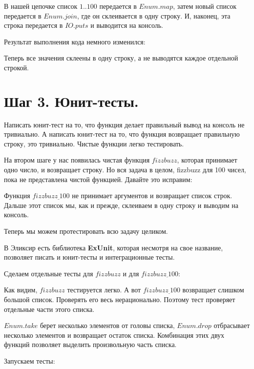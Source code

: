 В нашей цепочке список $1..100$ передается в $Enum.map$, затем новый список передается в $Enum.join$, где он склеивается в одну строку. И, наконец, эта строка передается в $IO.puts$ и выводится на консоль.

Результат выполнения кода немного изменился:



Теперь все значения склеены в одну строку, а не выводятся каждое отдельной строкой.

\section{Шаг 3. Юнит-тесты.}

Написать юнит-тест на то, что функция делает правильный вывод на консоль не тривиально. А написать юнит-тест на то, что функция возвращает правильную строку, это тривиально. Чистые функции легко тестировать.

На втором шаге у нас появилась чистая функция $fizzbuzz$, которая принимает одно число, и возвращает строку. Но вся задача в целом, fizzbuzz для 100 чисел, пока не представлена чистой функцией. Давайте это исправим:



Функция $fizzbuzz\underline\ 100$ не принимает аргументов и возвращает список строк. Дальше этот список мы, как и прежде, склеиваем в одну строку и выводим на консоль. 

Теперь мы можем протестировать всю задачу целиком.

В Эликсир есть библиотека \textbf{ExUnit}, которая несмотря на свое название, позволяет писать и юнит-тесты и интеграционные тесты.

Сделаем отдельные тесты для $fizzbuzz$ и для $fizzbuzz\underline\ 100$:



Как видим, $fizzbuzz$ тестируется легко. А вот $fizzbuzz\underline\ 100$ возвращает слишком большой список. Проверять его весь нерационально. Поэтому тест проверяет отдельные части этого списка.

$Enum.take$ берет несколько элементов от головы списка, $Enum.drop$ отбрасывает несколько элементов и возвращает остаток списка. Комбинация этих двух функций позволяет выделить произвольную часть списка.

Запускаем тесты:


